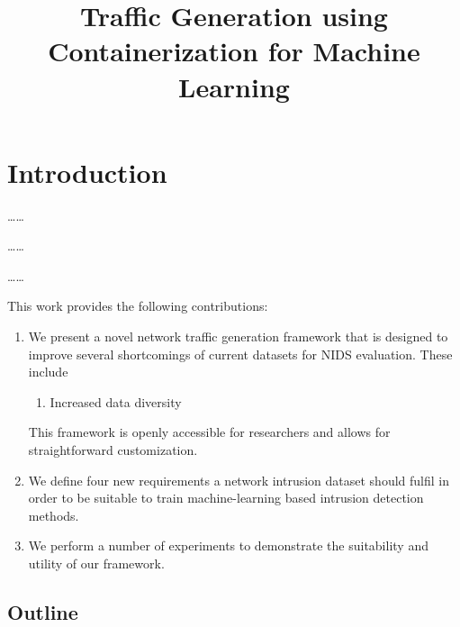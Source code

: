 \documentclass[sigconf]{acmart}
\begin{document}
\title{Traffic Generation using Containerization for Machine Learning}



\begin{abstract}

\end{abstract}


\maketitle

\section{Introduction}


\dots \dots

\dots \dots

\dots \dots

This work provides the following contributions:

\begin{enumerate}
 \item We present a novel network traffic generation framework that is designed to improve several shortcomings of current datasets for NIDS evaluation. These include
 \begin{enumerate}
 \item Increased data diversity 
 \end{enumerate}
 
 
 This framework is openly accessible for researchers and allows for straightforward customization.
 \item We define four new requirements a network intrusion dataset should fulfil in order to be suitable to train machine-learning based intrusion detection methods. 
 \item We perform a number of experiments to demonstrate the suitability and utility of our framework. 
\end{enumerate}

\subsection{Outline}
\end{document}

